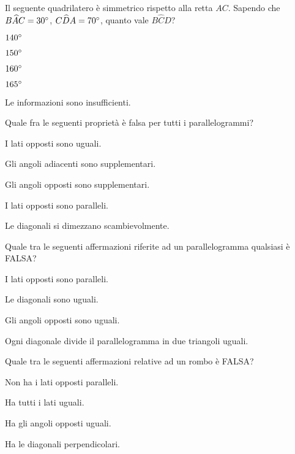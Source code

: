 \begin{esercizio}
\label{ese:4.60}
Il seguente quadrilatero è simmetrico rispetto alla retta $AC$.
Sapendo che $B\widehat{A}C = 30{}^{\circ}$, $C\widehat{D}A = 70{}^{\circ}$, quanto vale $B\widehat{C}D$?
\begin{enumeratea}
\item $140{}^{\circ}$
\item $150{}^{\circ}$
\item $160{}^{\circ}$
\item $165{}^{\circ}$
\item Le informazioni sono insufficienti.
\end{enumeratea}
\end{esercizio}

\begin{esercizio}
\label{ese:4.61}
Quale fra le seguenti proprietà è falsa per tutti i parallelogrammi?
\begin{enumeratea}
\item I lati opposti sono uguali.
\item Gli angoli adiacenti sono supplementari.
\item Gli angoli opposti sono supplementari.
\item I lati opposti sono paralleli.
\item Le diagonali si dimezzano scambievolmente.
\end{enumeratea}
\end{esercizio}

\begin{esercizio}
\label{ese:4.62}
Quale tra le seguenti affermazioni riferite ad un parallelogramma qualsiasi è FALSA?
\begin{enumeratea}
\item I lati opposti sono paralleli.
\item Le diagonali sono uguali.
\item Gli angoli opposti sono uguali.
\item Ogni diagonale divide il parallelogramma in due triangoli uguali.
\end{enumeratea}
\end{esercizio}

\begin{esercizio}
\label{ese:4.63}
Quale tra le seguenti affermazioni relative ad un rombo è FALSA?
\begin{enumeratea}
\item Non ha i lati opposti paralleli.
\item Ha tutti i lati uguali.
\item Ha gli angoli opposti uguali.
\item Ha le diagonali perpendicolari.
\end{enumeratea}
\end{esercizio}

